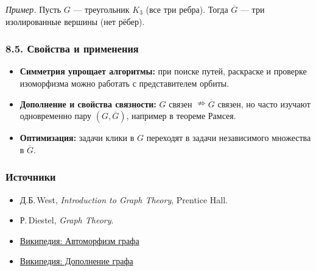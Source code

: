 \emph{Пример.} Пусть $G$ — треугольник $K_3$ (все три ребра). Тогда $\overline{G}$ — три изолированные вершины (нет рёбер).

\subsubsection{8.5. Свойства и применения}

\begin{itemize}[leftmargin=*]
  \item \textbf{Симметрия упрощает алгоритмы:} при поиске путей, раскраске и проверке изоморфизма можно работать с представителем орбиты.
  \item \textbf{Дополнение и свойства связности:} $G$ связен $\nRightarrow \overline G$ связен, но часто изучают одновременно пару $(G,\overline G)$, например в теореме Рамсея.
  \item \textbf{Оптимизация:} задачи клики в $G$ переходят в задачи независимого множества в $\overline G$.
\end{itemize}

\subsubsection{Источники}

\begin{itemize}
  \item Д.Б.\,West, \emph{Introduction to Graph Theory}, Prentice Hall.
  \item Р.\,Diestel, \emph{Graph Theory}.
  \item \href{https://ru.wikipedia.org/wiki/Автоморфизм_графа}{Википедия: Автоморфизм графа}
  \item \href{https://ru.wikipedia.org/wiki/Дополнение_графа}{Википедия: Дополнение графа}
\end{itemize}
